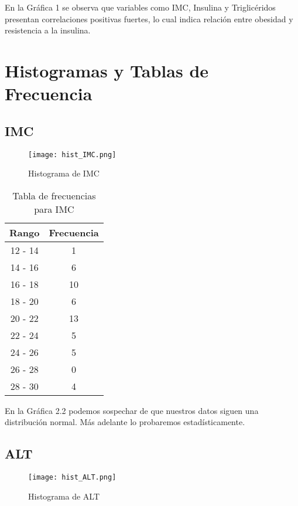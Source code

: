 \documentclass[12pt]{report}
\begin{document}
\noindent En la Gráfica 1 se observa que variables como IMC, Insulina y Triglicéridos presentan correlaciones positivas fuertes, lo cual indica relación entre obesidad y resistencia a la insulina.
\section{Histogramas y Tablas de Frecuencia}

\subsection{IMC}
\begin{figure}[H]
    \centering
    \texttt{[image: hist\_IMC.png]}
    \caption{Histograma de IMC}
\end{figure}

\begin{table}[H]
    \centering
    \begin{tabular}{|c|c|}
        \hline
        \textbf{Rango} & \textbf{Frecuencia} \\
        \hline
        12 - 14 & 1 \\
        14 - 16 & 6 \\
        16 - 18 & 10 \\
        18 - 20 & 6 \\
        20 - 22 & 13 \\
        22 - 24 & 5 \\
        24 - 26 & 5 \\
        26 - 28 & 0 \\
        28 - 30 & 4 \\
        \hline
    \end{tabular}
    \caption{Tabla de frecuencias para IMC}
\end{table}
\noindent En la Gráfica 2.2 podemos sospechar de que nuestros datos siguen una distribución normal. Más adelante lo probaremos estadísticamente.
\subsection{ALT}
\begin{figure}[H]
    \centering
    \texttt{[image: hist\_ALT.png]}
    \caption{Histograma de ALT}
\end{figure}
\end{document}
